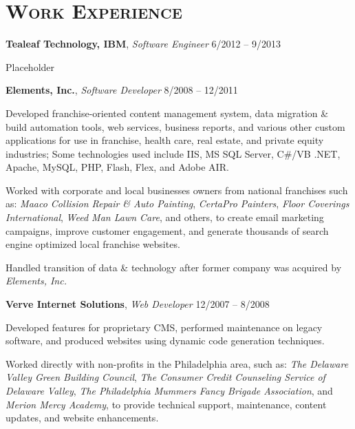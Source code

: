 \documentclass[12pt,a4paper]{article}
\newcommand{\sectionhead}{\normalfont\normalsize\scshape}
\newcommand{\workhead}[3]{\textbf{#1}, \emph{#2} \hfill #3}
\newcommand{\li}{\item[--]}
\begin{document}
\section*{\sectionhead Work Experience}
\begin{description}[leftmargin=0em] 

	\itemsep10pt
	\parskip0pt

    \item 
        \workhead{Tealeaf Technology, IBM}{Software Engineer}{6/2012 -- 9/2013}
        \begin{itemize*}
            \li Placeholder
        \end{itemize*}

    \item 
        \workhead{Elements, Inc.}{Software Developer}{8/2008 -- 12/2011}
        \begin{itemize*}
            \li Developed franchise-oriented content management system, data migration \& build automation tools, web services, business reports, and various other custom applications for use in franchise, health care, real estate, and private equity industries; Some technologies used include IIS, MS SQL Server, C\#/VB .NET, Apache, MySQL, PHP, Flash, Flex, and Adobe AIR.
            \li Worked with corporate and local businesses owners from national franchises such as: \emph{Maaco Collision Repair \& Auto Painting}, \emph{CertaPro Painters}, \emph{Floor Coverings International}, \emph{Weed Man Lawn Care}, and others, to create email marketing campaigns, improve customer engagement, and generate thousands of search engine optimized local franchise websites.
            \li Handled transition of data \& technology after former company was acquired by \emph{Elements, Inc.}
        \end{itemize*}

    \item 
        \workhead{Verve Internet Solutions}{Web Developer}{12/2007 -- 8/2008}
        \begin{itemize*}
            \li Developed features for proprietary CMS, performed maintenance on legacy software, and produced websites using dynamic code generation techniques.
            \li Worked directly with non-profits in the Philadelphia area, such as: \emph{The Delaware Valley Green Building Council}, \emph{The Consumer Credit Counseling Service of Delaware Valley}, \emph{The Philadelphia Mummers Fancy Brigade Association}, and \emph{Merion Mercy Academy}, to provide technical support, maintenance, content updates, and website enhancements.
        \end{itemize*}


\end{description}
\end{document}
